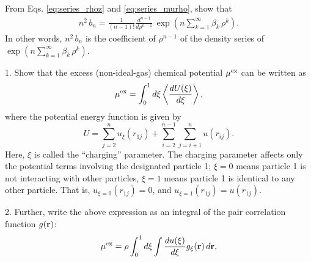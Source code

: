 \documentclass[12pt]{book}
\begin{document}



From Eqs. \eqref{eq:series_rhoz} and \eqref{eq:series_murho},
show that
\begin{align}
  n^2 \, b_n
=
  \frac{1} {(n - 1)!}
  \frac{ d^{n-1} } { d \rho^{n-1} }
  \,
  \exp
  \left(
  n \sum_{k = 1}^\infty \beta_k \, \rho^k
  \right).
\end{align}
In other words,
$n^2 \, b_n$
is the coefficient of $\rho^{n-1}$
of the density series of
$\exp \left( n \sum_{k = 1}^\infty \beta_k \, \rho^k \right)$.









1. Show that the excess (non-ideal-gas) chemical potential ${ { \mu }^{ \mathrm{ex} } }$ can be written as
\begin{equation}
  { { \mu }^{ \mathrm{ex} } }
=
  \int_0^1 d\xi \left\langle \frac{d U(\xi)}{d\xi} \right\rangle,
  \label{eq:muti}
\end{equation}
%
where the potential energy function is given by
\[
  U =
  \sum_{j = 2}^n u_\xi(r_{1j})
  +
  \sum_{i = 2}^{n - 1} \sum_{j = i+1}^n u(r_{ij}).
\]
%
Here, $\xi$ is called the ``charging'' parameter.
%
The charging parameter affects only the potential terms involving
the designated particle 1;
$\xi = 0$ means particle 1 is not interacting with other particles,
$\xi = 1$ means particle 1 is identical to any other particle.
%
That is,
$u_{\xi = 0}(r_{1j}) = 0$,
and
$u_{\xi = 1}(r_{1j}) = u(r_{1j})$.

2. Further, write the above expression as an integral of
the pair correlation function $g(\boldsymbol{\mathbf{r}})$:
\begin{equation}
  { { \mu }^{ \mathrm{ex} } }
=
  \rho \int_0^1 d\xi \int \frac{d u(\xi)}{d\xi} g_\xi(\boldsymbol{\mathbf{r}}) \, d\boldsymbol{\mathbf{r}},
  \label{eq:mutigr}
\end{equation}
\end{document}
